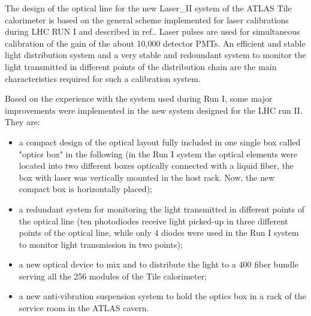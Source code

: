 The design of the optical line for the new Laser\_II system of the ATLAS Tile
calorimeter is based on the general scheme implemented for laser calibrations
during LHC RUN I and described in ref.\cite{ref:laser_I}. Laser pulses are used for
simultaneous calibration of the gain of the about 10,000 detector PMTs.
An efficient and stable light distribution system and a very stable and redoundant
system to monitor the light transmitted in different points of the distribution
chain are the main characteristics required for such a calibration system.

Based on the experience with the system used during Run I, some major improvements
were implemented in the new system designed for the LHC run II. They are:
\begin{itemize}
\item a compact design of the optical layout fully included in one single box called
"optics box" in the following (in the Run I system the optical elements were located
into two different boxes optically connected with a liquid fiber, the box with laser
was vertically mounted in the host rack. Now, the new compact box is horizontally
placed);
\item a redundant system for monitoring the light transmitted in different points of
the optical line (ten photodiodes receive light picked-up in three
different points of the optical line, while only 4 diodes were used in the Run I
system to monitor light transmission in two points);
\item a new optical device to mix and to distribute the light to a 400 fiber bundle
serving all the 256 modules of the Tile calorimeter;
\item a new anti-vibration suspension system to hold the optics box in a rack of the
service room in the ATLAS cavern.   
\end{itemize}
% 
